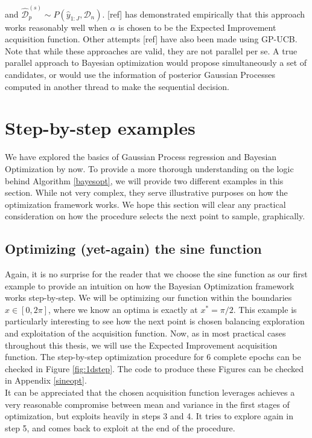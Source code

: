 \documentclass[10pt,a4paper,twoside]{book}
\begin{document}
and $\hat{\mathcal{D}}_p^{(s)} \sim P(\hat{y}_{1:J}, \mathcal{D}_n)$. [ref] has demonstrated empirically that this approach works reasonably well when $\alpha$ is chosen to be the Expected Improvement acquisition function. Other attempts [ref] have also been made using GP-UCB. Note that while these approaches are valid, they are not parallel per se. A true parallel approach to Bayesian optimization would propose simultaneously a set of candidates, or would use the information of posterior Gaussian Processes computed in another thread to make the sequential decision. 


\section{Step-by-step examples}

We have explored the basics of Gaussian Process regression and Bayesian Optimization by now. To provide a more thorough understanding on the logic behind Algorithm \ref{bayesopt}, we will provide two different examples in this section. While not very complex, they serve illustrative purposes on how the optimization framework works. We hope this section will clear any practical consideration on how the procedure selects the next point to sample, graphically.

\subsection{Optimizing (yet-again) the sine function}

Again, it is no surprise for the reader that we choose the sine function as our first example to provide an intuition on how the Bayesian Optimization framework works step-by-step. We will be optimizing our function within the boundaries $x \in [0, 2\pi]$, where we know an optima is exactly at $x^* = \pi/2$. This example is particularly interesting to see how the next point is chosen balancing exploration and exploitation of the acquisition function. Now, as in most practical cases throughout this thesis, we will use the Expected Improvement acquisition function. The step-by-step optimization procedure for 6 complete epochs can be checked in Figure \ref{fig:1dstep}. The code to produce these Figures can be checked in Appendix \ref{sineopt}.\\

It can be appreciated that the chosen acquisition function leverages achieves a very reasonable compromise between mean and variance in the first stages of optimization, but exploits heavily in steps 3 and 4. It tries to explore again in step 5, and comes back to exploit at the end of the procedure.
\end{document}
